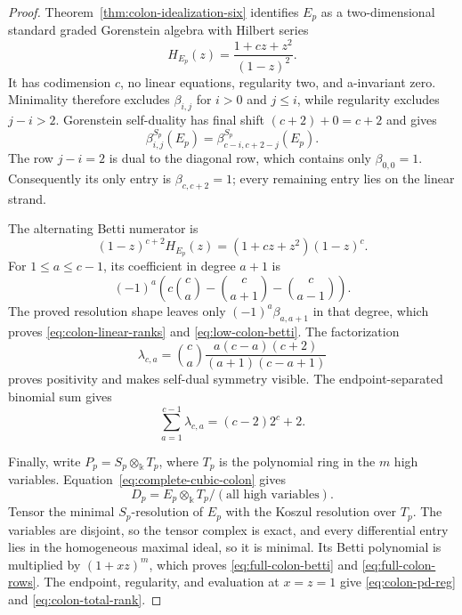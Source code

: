 \documentclass[11pt]{article}
\theoremstyle{definition}
\theoremstyle{remark}
\newcommand{\kfield}{\Bbbk}
\begin{document}
\begin{proof}
Theorem~\ref{thm:colon-idealization-six} identifies \(E_p\) as a two-dimensional standard graded
Gorenstein algebra with Hilbert series
\[
H_{E_p}(z)=\frac{1+cz+z^2}{(1-z)^2}.
\]
It has codimension \(c\), no linear equations, regularity two, and a-invariant zero. Minimality
therefore excludes \(\beta_{i,j}\) for \(i>0\) and \(j\le i\), while regularity excludes
\(j-i>2\). Gorenstein self-duality has final shift \((c+2)+0=c+2\) and gives
\begin{equation}
\beta_{i,j}^{S_p}(E_p)=\beta_{c-i,c+2-j}^{S_p}(E_p).
\label{eq:colon-self-duality}
\end{equation}
The row \(j-i=2\) is dual to the diagonal row, which contains only \(\beta_{0,0}=1\).
Consequently its only entry is \(\beta_{c,c+2}=1\); every remaining entry lies on the linear
strand.

The alternating Betti numerator is
\begin{equation}
(1-z)^{c+2}H_{E_p}(z)=(1+cz+z^2)(1-z)^c.
\label{eq:colon-hilbert-numerator}
\end{equation}
For \(1\le a\le c-1\), its coefficient in degree \(a+1\) is
\[
(-1)^a\left(c\binom ca-\binom c{a+1}-\binom c{a-1}\right).
\]
The proved resolution shape leaves only \((-1)^a\beta_{a,a+1}\) in that degree, which proves
\eqref{eq:colon-linear-ranks} and \eqref{eq:low-colon-betti}. The factorization
\[
\lambda_{c,a}=\binom ca
 \frac{a(c-a)(c+2)}{(a+1)(c-a+1)}
\]
proves positivity and makes self-dual symmetry visible. The endpoint-separated binomial sum gives
\[
\sum_{a=1}^{c-1}\lambda_{c,a}=(c-2)2^c+2.
\]

Finally, write \(P_p=S_p\otimes_\kfield T_p\), where \(T_p\) is the polynomial ring in the \(m\)
high variables. Equation~\eqref{eq:complete-cubic-colon} gives
\[
D_p=E_p\otimes_\kfield T_p/(\text{all high variables}).
\]
Tensor the minimal \(S_p\)-resolution of \(E_p\) with the Koszul resolution over \(T_p\). The
variables are disjoint, so the tensor complex is exact, and every differential entry lies in the
homogeneous maximal ideal, so it is minimal. Its Betti polynomial is multiplied by \((1+xz)^m\),
which proves \eqref{eq:full-colon-betti} and \eqref{eq:full-colon-rows}. The endpoint, regularity,
and evaluation at \(x=z=1\) give \eqref{eq:colon-pd-reg} and \eqref{eq:colon-total-rank}.
\end{proof}
\end{document}

